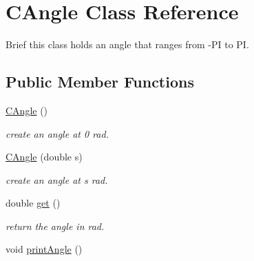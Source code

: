 \hypertarget{class_c_angle}{
\section{CAngle Class Reference}
\label{class_c_angle}
}


Brief this class holds an angle that ranges from -\/PI to PI.  


\subsection*{Public Member Functions}
\begin{DoxyCompactItemize}
\item 
\hypertarget{class_c_angle_aa47bc939ce401caa4b7b04153737d4ad}{
\hyperlink{class_c_angle_aa47bc939ce401caa4b7b04153737d4ad}{CAngle} ()}
\label{class_c_angle_aa47bc939ce401caa4b7b04153737d4ad}

\begin{DoxyCompactList}\small\item\em create an angle at 0 rad. \item\end{DoxyCompactList}\item 
\hypertarget{class_c_angle_ad1dd62cee0f725de2fa756530cd4f796}{
\hyperlink{class_c_angle_ad1dd62cee0f725de2fa756530cd4f796}{CAngle} (double s)}
\label{class_c_angle_ad1dd62cee0f725de2fa756530cd4f796}

\begin{DoxyCompactList}\small\item\em create an angle at s rad. \item\end{DoxyCompactList}\item 
\hypertarget{class_c_angle_a0f561013ffb3ed3c7fcf914a91dad5c2}{
double \hyperlink{class_c_angle_a0f561013ffb3ed3c7fcf914a91dad5c2}{get} ()}
\label{class_c_angle_a0f561013ffb3ed3c7fcf914a91dad5c2}

\begin{DoxyCompactList}\small\item\em return the angle in rad. \item\end{DoxyCompactList}\item 
\hypertarget{class_c_angle_a76a13932b26497bb8358c4a3099414a3}{
void \hyperlink{class_c_angle_a76a13932b26497bb8358c4a3099414a3}{printAngle} ()}
\label{class_c_angle_a76a13932b26497bb8358c4a3099414a3}


\end{DoxyCompactItemize}
